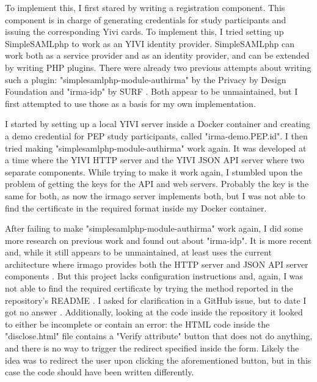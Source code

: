 \documentclass{report}
\begin{document}
To implement this, I first stared by writing a registration component. This component is in charge of generating credentials for study participants and issuing the corresponding
Yivi cards.  
To implement this, I tried setting up SimpleSAMLphp \cite{simplesamlphp} to work as an YIVI \cite{about-irma} identity provider. SimpleSAMLphp can work both as a service provider and
as an identity provider, and can be extended by writing PHP plugins. There were already two previous attempts about writing such a plugin: 
"simplesamlphp-module-authirma" \cite{simplesamlphp-module-authirma} by the Privacy by Design Foundation \cite{privacybydesignfoundation} and "irma-idp" \cite{irma-idp} by SURF \cite{surf}.
Both appear to be unmaintained, but I first attempted to use those as a basis for my own implementation. \par
I started by setting up a local YIVI server inside a Docker container and creating a demo credential \cite{irma-docs-issuer} for PEP study participants, called "irma-demo.PEP.id". I
then tried making "simplesamlphp-module-authirma" work again. It was developed at a time where the YIVI HTTP server and the YIVI JSON API server where two separate components. While
trying to make it work again, I stumbled upon the problem of getting the keys for the API and web servers. Probably the key is the same for both, as now the irmago
server \cite{irma-docs-server} implements both, but I was not able to find the certificate in the required format inside my Docker container. \par
After failing to make "simplesamlphp-module-authirma" work again, I did some more research on previous work and found out about "irma-idp". It is more recent and, while it still
appears to be unmaintained, at least uses the current architecture where irmago provides both the HTTP server and JSON API server components \cite{irma-docs-server}. But this
project lacks configuration instructions and, again, I was not able to find the required certificate by trying the method reported in the repository's README \cite{irma-idp}. I asked 
for clarification in a GitHub issue, but to date I got no answer \cite{irma-idp-issue}. Additionally, looking at the code inside the repository it looked to either be incomplete or
contain an error: the HTML code inside the "disclose.html" file contains a "Verify attribute" button that does not do anything, and there is no way to trigger the redirect specified
inside the form. Likely the idea was to redirect the user upon clicking the aforementioned button, but in this case the code should have been written differently. \par
\end{document}
